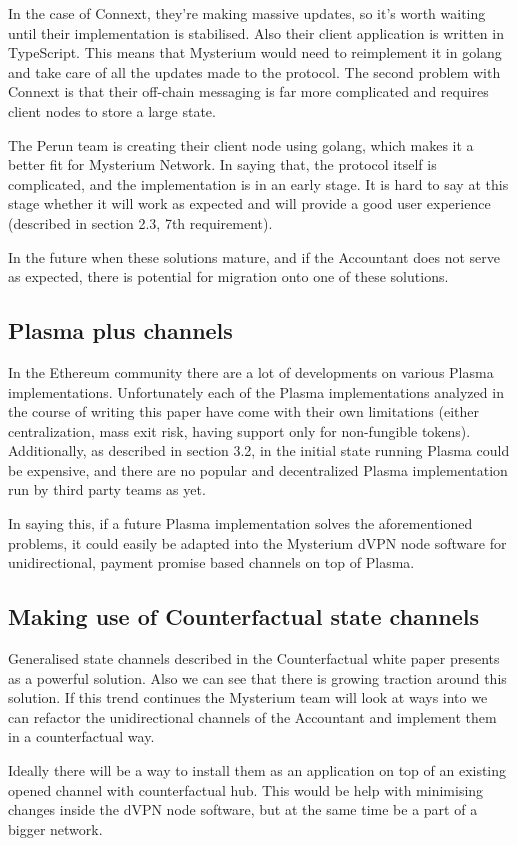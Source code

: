 \documentclass[a4paper,12pt]{article}
\begin{document}
In the case of Connext, they’re making massive updates, so it’s worth waiting until 
their implementation is stabilised. Also their client application is written in 
TypeScript. This means that Mysterium would need to reimplement it in golang and 
take care of all the updates made to the protocol. The second problem with Connext 
is that their off-chain messaging is far more complicated and requires client 
nodes to store a large state.

The Perun team is creating their client node using golang, which makes it a better 
fit for Mysterium Network. In saying that, the protocol itself is complicated, and 
the implementation is in an early stage. It is hard to say at this stage whether it 
will work as expected and will provide a good user experience (described in section 
2.3, 7th requirement).

In the future when these solutions mature, and if the Accountant does not serve as 
expected, there is potential for migration onto one of these solutions.

\subsection{Plasma plus channels}

In the Ethereum community there are a lot of developments on various Plasma 
implementations. Unfortunately each of the Plasma implementations analyzed in the 
course of writing this paper have come with their own limitations (either 
centralization, mass exit risk, having support only for non-fungible tokens). 
Additionally, as described in section 3.2, in the initial state running Plasma 
could be expensive, and there are no popular and decentralized Plasma 
implementation run by third party teams as yet.

In saying this, if a future Plasma implementation solves the aforementioned 
problems, it could easily be adapted into the Mysterium dVPN node software for 
unidirectional, payment promise based channels on top of Plasma. 

\subsection{Making use of Counterfactual state channels}

Generalised state channels described in the Counterfactual \cite{counterfactual} 
white paper presents as a powerful solution. Also we can see that there is growing 
traction around this solution. If this trend continues the Mysterium team will look 
at ways into we can refactor the unidirectional channels of the Accountant and 
implement them in a counterfactual way.

Ideally there will be a way to install them as an application on top of an existing 
opened channel with counterfactual hub. This would be help with minimising changes 
inside the dVPN node software, but at the same time be a part of a bigger network.

\newpage
\printbibliography[heading=bibintoc]
\end{document}
